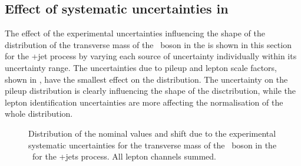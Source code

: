 \subsection{Effect of systematic uncertainties in \WZCR}
\label{sec:MTW}
The effect of the experimental uncertainties influencing the shape of the distribution of the transverse mass of the \PW\ boson in the \WZCR is shown in this section for the \WZ+jet process by varying each source of uncertainty individually within its uncertainty range. The uncertainties due to pileup and lepton scale factors, shown in , have the smallest effect on the distribution. The uncertainty on the pileup distribution is clearly influencing the shape of the disctribution, while the lepton identification uncertainties are more affecting the normalisation of the whole distribution. 
\begin{figure}[htbp] 
	\centering 
	\caption{Distribution of the nominal values and shift due to the experimental systematic uncertainties for the transverse mass of the \PW\ boson in the \WZCR\ for the \WZ+jets process. All lepton channels summed.}
\label{fig:shiftMTW1}
\end{figure}

